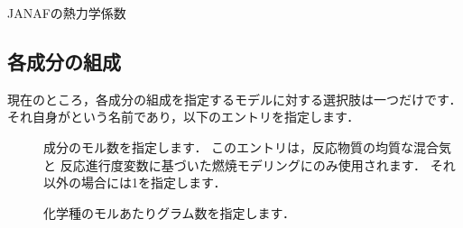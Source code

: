 \begin{table}[ht]
 
 \caption{JANAFの熱力学係数}
 \label{tbl:7.3}
\end{table}


\subsection{各成分の組成}
\label{ssec:7.1.4@3.0.1}
現在のところ，各成分の組成を指定するモデルに対する選択肢は一つだけです．
それ自身がという名前であり，以下のエントリを指定します．
\begin{description}
 \item[]
            成分のモル数を指定します．
            このエントリは，反応物質の均質な混合気と
            反応進行度変数に基づいた燃焼モデリングにのみ使用されます．
            それ以外の場合には1を指定します．
 \item[]
            化学種のモルあたりグラム数を指定します．
\end{description}


